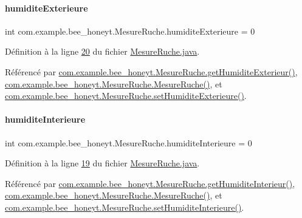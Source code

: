 \paragraph{\texorpdfstring{humidite\+Exterieure}{humiditeExterieure}}
{\footnotesize\ttfamily int com.\+example.\+bee\+\_\+honeyt.\+Mesure\+Ruche.\+humidite\+Exterieure = 0\hspace{0.3cm}{\ttfamily [private]}}



Définition à la ligne \hyperlink{_mesure_ruche_8java_source_l00020}{20} du fichier \hyperlink{_mesure_ruche_8java_source}{Mesure\+Ruche.\+java}.



Référencé par \hyperlink{_mesure_ruche_8java_source_l00082}{com.\+example.\+bee\+\_\+honeyt.\+Mesure\+Ruche.\+get\+Humidite\+Exterieur()}, \hyperlink{_mesure_ruche_8java_source_l00030}{com.\+example.\+bee\+\_\+honeyt.\+Mesure\+Ruche.\+Mesure\+Ruche()}, et \hyperlink{_mesure_ruche_8java_source_l00087}{com.\+example.\+bee\+\_\+honeyt.\+Mesure\+Ruche.\+set\+Humidite\+Exterieure()}.

\mbox{\label{classcom_1_1example_1_1bee__honeyt_1_1_mesure_ruche_a3b5d2536649e0acaf1eebeba4409c9bb}} 
\paragraph{\texorpdfstring{humidite\+Interieure}{humiditeInterieure}}
{\footnotesize\ttfamily int com.\+example.\+bee\+\_\+honeyt.\+Mesure\+Ruche.\+humidite\+Interieure = 0\hspace{0.3cm}{\ttfamily [private]}}



Définition à la ligne \hyperlink{_mesure_ruche_8java_source_l00019}{19} du fichier \hyperlink{_mesure_ruche_8java_source}{Mesure\+Ruche.\+java}.



Référencé par \hyperlink{_mesure_ruche_8java_source_l00072}{com.\+example.\+bee\+\_\+honeyt.\+Mesure\+Ruche.\+get\+Humidite\+Interieur()}, \hyperlink{_mesure_ruche_8java_source_l00030}{com.\+example.\+bee\+\_\+honeyt.\+Mesure\+Ruche.\+Mesure\+Ruche()}, et \hyperlink{_mesure_ruche_8java_source_l00077}{com.\+example.\+bee\+\_\+honeyt.\+Mesure\+Ruche.\+set\+Humidite\+Interieure()}.

